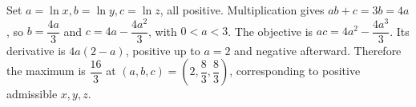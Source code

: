 Set $a=\ln x,b=\ln y,c=\ln z$, all positive. Multiplication gives $ab+c=3b=4a$, so $b = \dfrac{4 a}{3}$ and $c = 4 a - \dfrac{4 a^2}{3}$, with $0<a<3$. The objective is $a c = 4 a^2 - \dfrac{4 a^3}{3}$. Its derivative is $4a(2-a)$, positive up to $a=2$ and negative afterward. Therefore the maximum is $\boxed{\dfrac{16}{3}}$ at $(a,b,c) = (2 , \dfrac{8}{3} , \dfrac{8}{3})$, corresponding to positive admissible $x,y,z$.
